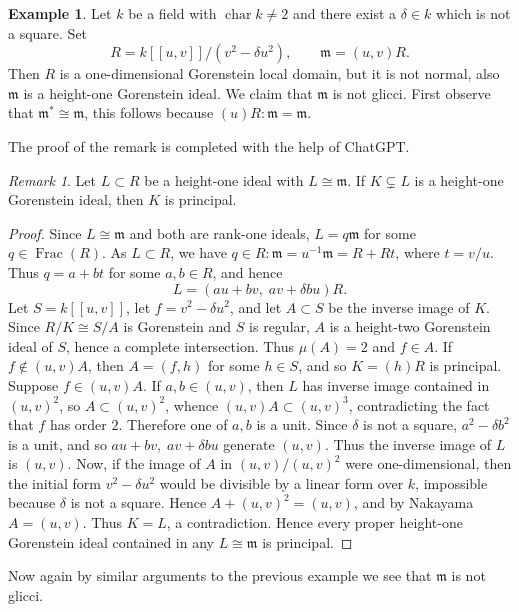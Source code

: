 \documentclass[11pt,letterpaper]{amsart}
\theoremstyle{plain}
\theoremstyle{definition}
\newtheorem{ex}[thm]{Example}
\theoremstyle{remark}
\newtheorem{remark}[thm]{Remark}
\begin{document}
\begin{ex}
Let $k$ be a field with $\operatorname{char} k\neq 2$ and there exist a $\delta\in k$ which is not a square. Set
\[
R=k[[u,v]]/(v^2-\delta u^2),\qquad \mathfrak m=(u,v)R.
\]
Then $R$ is a one-dimensional Gorenstein local domain, but it is not normal, also $\mathfrak m$ is a height-one Gorenstein ideal. We claim that $\mathfrak m$ is not glicci. First observe that $\mathfrak m^*\cong \mathfrak m$, this follows because $(u)R:\mathfrak m=\mathfrak m$. %

The proof of the remark is completed with the help of ChatGPT.
\begin{remark}
    Let $L\subset R$ be a height-one ideal with $L\cong \mathfrak m$. If $K\subsetneq L$ is a height-one Gorenstein ideal, then $K$ is principal.
\end{remark}
\begin{proof}
  Since $L\cong \mathfrak m$ and both are rank-one ideals, $L=q\mathfrak m$ for some $q\in \operatorname{Frac}(R)$. As $L\subset R$, we have $q\in R:\mathfrak m=u^{-1}\mathfrak m=R+Rt$, where $t=v/u$. Thus $q=a+bt$ for some $a,b\in R$, and hence
\[
L=(au+bv,\; av+\delta bu)R.
\]
Let $S=k[[u,v]]$, let $f=v^2-\delta u^2$, and let $A\subset S$ be the inverse image of $K$. Since $R/K\cong S/A$ is Gorenstein and $S$ is regular, $A$ is a height-two Gorenstein ideal of $S$, hence a complete intersection. Thus $\mu(A)=2$ and $f\in A$. If $f\notin (u,v)A$, then $A=(f,h)$ for some $h\in S$, and so $K=(h)R$ is principal. Suppose $f\in (u,v)A$. If $a,b\in (u,v)$, then $L$ has inverse image contained in $(u,v)^2$, so $A\subset (u,v)^2$, whence $(u,v)A\subset (u,v)^3$, contradicting the fact that $f$ has order $2$. Therefore one of $a,b$ is a unit. Since $\delta$ is not a square, $a^2-\delta b^2$ is a unit, and so $au+bv,\;av+\delta bu$ generate $(u,v)$. Thus the inverse image of $L$ is $(u,v)$. Now, if the image of $A$ in $(u,v)/(u,v)^2$ were one-dimensional, then the initial form $v^2-\delta u^2$ would be divisible by a linear form over $k$, impossible because $\delta$ is not a square. Hence $A+(u,v)^2=(u,v)$, and by Nakayama $A=(u,v)$. Thus $K=L$, a contradiction. Hence every proper height-one Gorenstein ideal contained in any $L\cong\mathfrak m$ is principal.
\end{proof}

Now again by similar arguments to the previous example we see that $\mathfrak m$ is not glicci. 
\end{ex}
\end{document}
